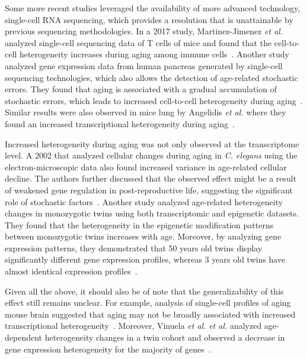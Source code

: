 Some more recent studies leveraged the availability of more advanced technology, single-cell RNA sequencing,
which provides a resolution that is unattainable by previous sequencing methodologies.
In a 2017 study, Martinez-Jimenez \textit{et al.} analyzed single-cell sequencing data of T cells of mice
and found that the cell-to-cell heterogeneity increases during aging among immune cells~\cite{Martinez2017}.
Another study analyzed gene expression data from human pancreas generated by single-cell sequencing technologies,
which also allows the detection of age-related stochastic errors.
They found that aging is associated with a gradual accumulation of stochastic errors,
which leads to increased cell-to-cell heterogeneity during aging~\cite{Enge2017}.
Similar results were also observed in mice lung by Angelidis \textit{et al.} 
where they found an increased transcriptional heterogeneity during aging~\cite{Angelidis2019}.

Increased heterogeneity during aging was not only observed at the transcriptome level.
A 2002 that analyzed cellular changes during aging in \textit{C. elegans} using the electron-microscopic data also found increased variance in age-related cellular decline.
The authors further discussed that the observed effect might be a result of weakened gene regulation in post-reproductive life, 
suggesting the significant role of stochastic factors~\cite{Herndon2002}.
Another study analyzed age-related heterogeneity changes in monozygotic twins using both transcriptomic and epigenetic datasets.
They found that the heterogeneity in the epigenetic modification patterns between monozygotic twins increases with age.
Moreover, by analyzing gene expression patterns, they demonstrated that 50 years old twins display significantly different gene expression profiles,
whereas 3 years old twins have almost identical expression profiles~\cite{Fraga2005}.

Given all the above, it should also be of note that the generalizability of this effect still remains unclear.
For example, analysis of single-cell profiles of aging mouse brain suggested that 
aging may not be broadly associated with increased transcriptional heterogeneity~\cite{Ximerakis2019}.
Moreover, Vinuela \textit{et al.} \textit{et al.} analyzed age-dependent heterogeneity changes in a twin cohort
and observed a decrease in gene expression heterogeneity for the majority of genes~\cite{Vinuela2018}.

